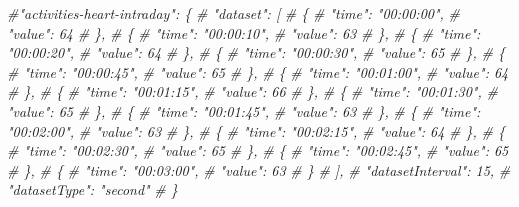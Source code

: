 \documentclass[]{book}
\newenvironment{Shaded}{\begin{snugshade}}{\end{snugshade}}
\newcommand{\CommentTok}[1]{\textcolor[rgb]{0.56,0.35,0.01}{\textit{#1}}}
\begin{document}
\begin{Shaded}
\begin{Highlighting}[]
\CommentTok{#"activities-heart-intraday": \{}
\CommentTok{#        "dataset": [}
\CommentTok{#            \{}
\CommentTok{#                "time": "00:00:00",}
\CommentTok{#                "value": 64}
\CommentTok{#            \},}
\CommentTok{#            \{}
\CommentTok{#                "time": "00:00:10",}
\CommentTok{#                "value": 63}
\CommentTok{#            \},}
\CommentTok{#            \{}
\CommentTok{#                "time": "00:00:20",}
\CommentTok{#                "value": 64}
\CommentTok{#            \},}
\CommentTok{#            \{}
\CommentTok{#                "time": "00:00:30",}
\CommentTok{#                "value": 65}
\CommentTok{#            \},}
\CommentTok{#            \{}
\CommentTok{#                "time": "00:00:45",}
\CommentTok{#                "value": 65}
\CommentTok{#            \},}
\CommentTok{#            \{}
\CommentTok{#                "time": "00:01:00",}
\CommentTok{#                "value": 64}
\CommentTok{#            \},}
\CommentTok{#            \{}
\CommentTok{#                "time": "00:01:15",}
\CommentTok{#                "value": 66}
\CommentTok{#            \},}
\CommentTok{#            \{}
\CommentTok{#                "time": "00:01:30",}
\CommentTok{#                "value": 65}
\CommentTok{#            \},}
\CommentTok{#            \{}
\CommentTok{#                "time": "00:01:45",}
\CommentTok{#                "value": 63}
\CommentTok{#           \},}
\CommentTok{#            \{}
\CommentTok{#                "time": "00:02:00",}
\CommentTok{#                "value": 63}
\CommentTok{#            \},}
\CommentTok{#            \{}
\CommentTok{#                "time": "00:02:15",}
\CommentTok{#                "value": 64}
\CommentTok{#            \},}
\CommentTok{#            \{}
\CommentTok{#                "time": "00:02:30",}
\CommentTok{#                "value": 65}
\CommentTok{#            \},}
\CommentTok{#            \{}
\CommentTok{#                "time": "00:02:45",}
\CommentTok{#                "value": 65}
\CommentTok{#            \},}
\CommentTok{#            \{}
\CommentTok{#                "time": "00:03:00",}
\CommentTok{#                "value": 63}
\CommentTok{#            \}}
\CommentTok{#        ],}
\CommentTok{#        "datasetInterval": 15,}
\CommentTok{#        "datasetType": "second"}
\CommentTok{#    \}}
\end{Highlighting}
\end{Shaded}
\end{document}
